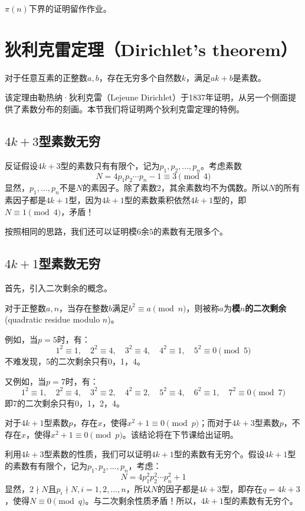﻿\documentclass[11pt]{article}
\newtheorem{theorem}{{\hskip 1.7em \bf 定理}}
\newtheorem{definition}[theorem]{\hskip 1.7em 定义}
\begin{document}
    $\pi(n)$下界的证明留作作业。

    \section{狄利克雷定理（Dirichlet's theorem）}
        \begin{theorem}
            对于任意互素的正整数$a,b$，存在无穷多个自然数$k$，满足$ak+b$是素数。
        \end{theorem}
        该定理由勒热纳·狄利克雷（Lejeune Dirichlet）于1837年证明，从另一个侧面提供了素数分布的刻画。本节我们将证明两个狄利克雷定理的特例。
    \subsection{$4k+3$型素数无穷}
    反证假设$4k+3$型的素数只有有限个，记为$p_{1},p_{2},...,p_{n}$。考虑素数
    \[N=4p_{1}p_2\cdots p_{n}-1 \equiv 3 \pmod4\]
    显然，$p_{1},...,p_{n}$不是$N$的素因子。除了素数2，其余素数均不为偶数。所以$N$的所有素因子都是$4k+1$型，因为$4k+1$型的素数乘积依然$4k+1$型的，即$N\equiv 1\pmod 4$，矛盾！

    按照相同的思路，我们还可以证明模$6$余$5$的素数有无限多个。
    \subsection{$4k+1$型素数无穷}
    首先，引入二次剩余的概念。

    \begin{definition}[二次剩余]
        对于正整数$a,n$，当存在整数$b$满足$b^2\equiv a\pmod n$，则被称$a$为\textbf{模$n$的二次剩余}(quadratic residue modulo $n$)。
    \end{definition}

    例如，当$p=5$时，有：
    \[
        1^{2} \equiv 1,\quad 2^{2} \equiv 4,\quad 3^{2} \equiv 4,\quad 4^{2} \equiv 1,\quad 5^{2} \equiv 0 \pmod 5
    \]
    不难发现，5的二次剩余只有0，1，4。

    又例如，当$p=7$时，有：
    \[
        1^{2} \equiv 1,\quad 2^{2} \equiv 4,\quad 3^{2} \equiv 2,\quad 4^{2} \equiv 2,\quad 5^{2} \equiv 4,\quad 6^{2} \equiv 1,\quad 7^2 \equiv 0\pmod 7
    \]
    即7的二次剩余只有0，1，2，4。

    对于$4k+1$型素数$p$，存在$x$，使得$x^{2}+1 \equiv 0 \pmod p$；而对于$4k+3$型素数$p$，不存在$x$，使得$x^{2}+1 \equiv 0 \pmod p$。该结论将在下节课给出证明。

    利用$4k+3$型素数的性质，我们可以证明$4k+1$型的素数有无穷个。假设$4k+1$型的素数有有限个，记为$p_{1},p_{2},...,p_{n}$，考虑：
    \[N=4p_{1}^{2}p_2^2\cdots p_{n}^2+1\]
    显然，$2\nmid N$且$p_{i} \nmid N,i=1,2,...,n$，所以$N$的因子都是$4k+3$型，即存在$q=4k+3$，使得$N \equiv 0\pmod q$。与二次剩余性质矛盾！所以，$4k+1$型的素数有无穷个。
\end{document}
